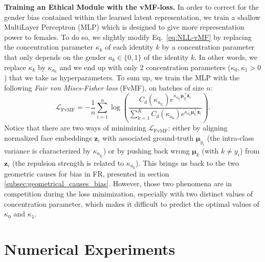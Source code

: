 \documentclass[nohyperref]{article}
\theoremstyle{plain}
\theoremstyle{definition}
\theoremstyle{remark}
\newcommand{\vect}[1]{{\bm{#1}}}
\begin{document}
{\bf Training an Ethical Module with the vMF-loss.}
In order to correct for the gender bias contained within the learned latent representation, we train a shallow MultiLayer Perceptron (MLP) which is designed to give more representation power to females. To do so, we slightly modify Eq.~\ref{eq:NLL-vMF} by replacing the concentration parameter $\kappa_k$ of each identity $k$ by a concentration parameter that only depends on the gender $a_k \in \{0,1\}$ of the identity $k$. In other words, we replace $\kappa_k$ by $\kappa_{a_k}$ and we end up with only $2$ concentration parameters ($\kappa_0, \kappa_1 >0$) that we take as hyperparameters. To sum up, we train the MLP with the following {\it Fair von Mises-Fisher loss} (FvMF), on batches of size $n$:
\begin{equation}\label{eq:FvMF_loss}
\mathcal{L}_{\text{FvMF}} = -\frac{1}{n} \sum\limits_{i=1}^n \log \left( \frac{C_d(\kappa_{a_{y_i}}) e^{\displaystyle \kappa_{a_{y_i}}  \vect{\mu}_{y_i}^\intercal \vect{z}_i}}{ \sum_{k=1}^K  C_d(\kappa_{a_k}) e^{\displaystyle \kappa_{a_k} \vect{\mu}_k^\intercal \vect{z}_i} } \right).
\end{equation}
Notice that there are two ways of minimizing $\mathcal{L}_{\text{FvMF}}$: either by aligning normalized face embeddings $\vect{z}_i$ with associated ground-truth $\vect{\mu}_{y_i}$ (the intra-class variance is characterized by $\kappa_{a_{y_i}}$) or by pushing back wrong $\vect{\mu}_k$ (with $k \neq y_i$) from $\vect{z}_i$ (the repulsion strength is related to $\kappa_{a_k}$). This brings us back to the two geometric causes for bias in FR, presented in section \ref{subsec:geometrical_causes_bias}.
However, those two phenomena are in competition during the loss minimization, especially with two distinct values of concentration parameter, which makes it difficult to predict the optimal values of $\kappa_0$ and $\kappa_1$. 





 
\section{Numerical Experiments} \label{sec:expe}
\end{document}
